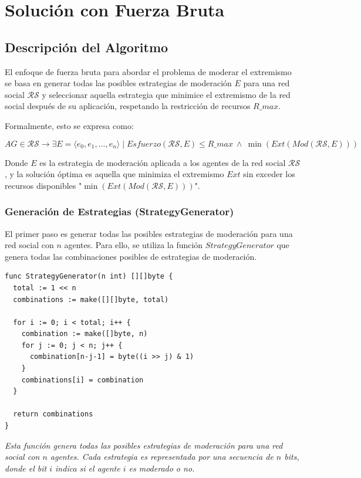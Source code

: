 \documentclass[letterpaper,10pt]{article}
\begin{document}
\section{Solución con Fuerza Bruta}
\label{sec:fuerza_bruta}

\subsection{Descripción del Algoritmo}
\label{subsec:descripcion_fuerza_bruta}
El enfoque de fuerza bruta para abordar el problema de moderar el extremismo se basa en generar todas las posibles estrategias de moderación \( E \) para una red social \( \mathcal{R}\mathcal{S} \) y seleccionar aquella estrategia que minimice el extremismo de la red social después de su aplicación, respetando la restricción de recursos \( R\_max \).

Formalmente, esto se expresa como:

\[
 AG \in \mathcal{R}\mathcal{S} \rightarrow \exists E = \langle e_0, e_1, \ldots, e_n \rangle \mid Esfuerzo(\mathcal{R}\mathcal{S}, E) \leqslant R\_max ~ \wedge ~ \min(Ext(Mod(\mathcal{R}\mathcal{S}, E)))
\]

Donde \( E \) es la estrategia de moderación aplicada a los agentes de la red social \( \mathcal{R}\mathcal{S} \), y la solución óptima es aquella que minimiza el extremismo \( Ext \) sin exceder los recursos disponibles "$\min(Ext(Mod(\mathcal{R}\mathcal{S}, E)))$".

\subsubsection*{Generación de Estrategias (StrategyGenerator)}
El primer paso es generar todas las posibles estrategias de moderación para una red social con \( n \) agentes. Para ello, se utiliza la función \( StrategyGenerator \) que genera todas las combinaciones posibles de estrategias de moderación.
\begin{lstlisting}[caption={Strategy Generator}, label={lst:strategy_generator}]
func StrategyGenerator(n int) [][]byte {
  total := 1 << n
  combinations := make([][]byte, total)
  
  for i := 0; i < total; i++ {
    combination := make([]byte, n)
    for j := 0; j < n; j++ {
      combination[n-j-1] = byte((i >> j) & 1)
    }
    combinations[i] = combination
  }

  return combinations
}
\end{lstlisting}
\textit{Esta función genera todas las posibles estrategias de moderación para una red social con \( n \) agentes. Cada estrategia es representada por una secuencia de \( n \) bits, donde el bit \( i \) indica si el agente \( i \) es moderado o no.
}
\\
\end{document}
